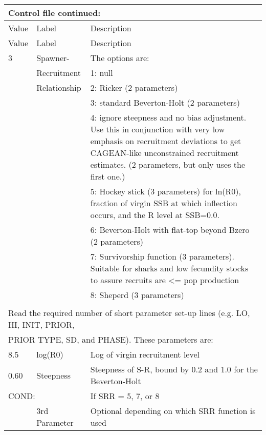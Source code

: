 \begin{center}
	\begin{longtable}{p{1cm} p{3cm} p{11cm}}
		\multicolumn{3}{l}{Control file continued:}\\
		\hline
		Value & Label &  Description\\
		\hline
		\endfirsthead

		\hline
		Value & Label &  Description\\
		\hline
		\endhead

		\endfoot
		\endlastfoot

		3 & Spawner-            & The options are: \\
		  & Recruitment         & 1: null \\
		  & Relationship        & 2:  Ricker (2 parameters) \\
		  &                     & 3:  standard Beverton-Holt (2 parameters) \\
		  &                     & 4:  ignore steepness and no bias adjustment.  Use this in conjunction with very low emphasis on recruitment deviations to get CAGEAN-like unconstrained recruitment estimates. (2 parameters, but only uses the first one.)\\
		  &                     & 5:  Hockey stick (3 parameters) for ln(R0), fraction of virgin SSB at which inflection occurs, and the R level at SSB=0.0.\\
		  &                     & 6:  Beverton-Holt with flat-top beyond Bzero (2 parameters)\\
		  &                     & 7:  Survivorship function (3 parameters).  Suitable for sharks and low fecundity stocks to assure recruits are <= pop production \\
	      &                     & 8:  Sheperd (3 parameters)\\
		\hline
		\\
		\multicolumn{3}{l}{Read the required number of short parameter set-up lines (e.g. LO, HI, INIT, PRIOR, }\\
		\multicolumn{3}{l}{PRIOR TYPE, SD, and PHASE).  These parameters are:}\\
		\hline
		8.5 & log(R0) & Log of virgin recruitment level \\
		\hline
		0.60 & Steepness  & Steepness of S-R, bound by 0.2 and 1.0 for the Beverton-Holt \\
		\hline
		\multicolumn{2}{l}{COND:} & If SRR = 5, 7, or 8\\
		& 3rd Parameter & Optional depending on which SRR function is used \\

\end{longtable}
\end{center}

